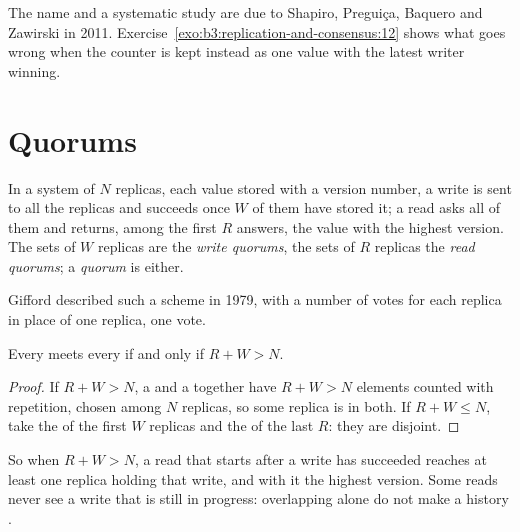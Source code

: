 The name and a systematic study are due to Shapiro, Preguiça, Baquero and Zawirski in 2011. %
Exercise~\ref{exo:b3:replication-and-consensus:12} shows what goes wrong when the counter is kept instead as one value with the latest writer winning.

\section{Quorums}\label{sec:b3:replication-and-consensus:quorums}

\begin{definition}\label{def:b3:replication-and-consensus:quorum}
In a system of $N$ replicas, each value stored with a version number, a write is sent to all the replicas and succeeds once $W$ of them have stored it; a read asks all of them and returns, among the first $R$ answers, the value with the highest version. The sets of $W$ replicas are the \emph{write quorums}, the sets of $R$ replicas the \emph{read quorums}; a \emph{quorum} is either.
\end{definition}

Gifford described such a scheme in 1979, with a number of votes for each replica in place of one replica, one vote. %

\begin{theorem}\label{thm:b3:replication-and-consensus:quorums}
Every  meets every  if and only if $R + W > N$.
\end{theorem}

\begin{proof}
If $R + W > N$, a  and a  together have $R + W > N$ elements counted with repetition, chosen among $N$ replicas, so some replica is in both. If $R + W \le N$, take the  of the first $W$ replicas and the  of the last $R$: they are disjoint.
\end{proof}

So when $R + W > N$, a read that starts after a write has succeeded reaches at least one replica holding that write, and with it the highest version. Some reads never see a write that is still in progress: overlapping  alone do not make a history .

